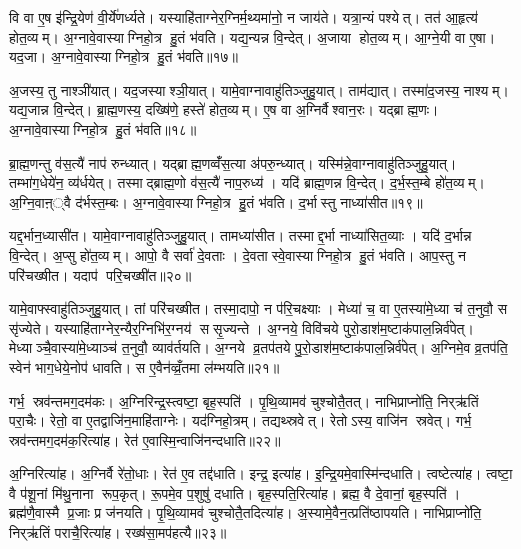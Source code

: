 वि वा ए॒ष इ॑न्द्रि॒येण॑ वी॒र्ये॑णर्ध्यते। यस्याहि॑ताग्नेर॒ग्निर्म॒थ्यमा॑नो॒ न जाय॑ते। यत्रा॒न्यं पश्येत्। तत॑ आ॒हृत्य॑ होत॒व्यम्। अ॒ग्नावे॒वास्याग्निहो॒त्र हु॒तं भ॑वति। यद्य॒न्यन्न वि॒न्देत्। अ॒जाया होत॒व्यम्। आ॒ग्ने॒यी वा ए॒षा। यद॒जा। अ॒ग्नावे॒वास्याग्निहो॒त्र हु॒तं भ॑वति॥१७॥

अ॒जस्य॒ तु नाश्ञी॑यात्। यद॒जस्याश्ञी॒यात्। यामे॒वाग्नावाहु॑तिञ्जुहु॒यात्। ताम॑द्यात्। तस्मा॑द॒जस्य॒ नाश्यम्। यद्य॒जान्न वि॒न्देत्। ब्रा॒ह्म॒णस्य॒ दख्षि॑णे॒ हस्ते॑ होत॒व्यम्। ए॒ष वा अ॒ग्निर्वैश्वान॒रः। यद्ब्राह्म॒णः। अ॒ग्नावे॒वास्याग्निहो॒त्र हु॒तं भ॑वति॥१८॥

ब्रा॒ह्म॒णन्तु व॑स॒त्यै॑ नाप॑ रुन्ध्यात्। यद्ब्राह्म॒णव्वँ॑स॒त्या अ॑परु॒न्ध्यात्। यस्मि॑न्ने॒वाग्नावाहु॑तिञ्जुहु॒यात्। तम्भा॑ग॒धेये॑न॒ व्य॑र्धयेत्। तस्माद्ब्राह्म॒णो व॑स॒त्यै॑ नाप॒रुध्य॑। यदि॑ ब्राह्म॒णन्न वि॒न्देत्। द॒र्भ॒स्त॒म्बे हो॑त॒व्यम्। अ॒ग्नि॒वाऩ््वै द॑र्भस्त॒म्बः। अ॒ग्नावे॒वास्याग्निहो॒त्र हु॒तं भ॑वति। द॒र्भास्तु नाध्या॑सीत॥१९॥

यद्द॒र्भान॒ध्यासी॑त। यामे॒वाग्नावाहु॑तिञ्जुहु॒यात्। तामध्या॑सीत। तस्माद्द॒र्भा नाध्या॑सित॒व्याः। यदि॑ द॒र्भान्न वि॒न्देत्। अ॒प्सु हो॑त॒व्यम्। आपो॒ वै सर्वा॑ दे॒वताः। दे॒वतास्वे॒वास्याग्निहो॒त्र हु॒तं भ॑वति। आप॒स्तु न परि॑चख्षीत। यदाप॑ परि॒चख्षी॑त॥२०॥

यामे॒वाफ्स्वाहु॑तिञ्जुहु॒यात्। तां परि॑चख्षीत। तस्मा॒दापो॒ न प॑रि॒चक्ष्याः। मेध्या॑ च॒ वा ए॒तस्या॑मे॒ध्या च॑ त॒नुवौ॒ स सृ॑ज्येते। यस्याहि॑ताग्नेर॒न्यैर॒ग्निभि॑र॒ग्नय॑ ससृ॒ज्यन्ते। अ॒ग्नये॒ विवि॑चये पुरो॒डाश॑म॒ष्टाक॑पाल॒न्निर्व॑पेत्। मेध्याञ्चै॒वास्या॑मे॒ध्याञ्च॑ त॒नुवौ॒ व्याव॑र्तयति। अ॒ग्नये व्र॒तप॑तये पु॒रो॒डाश॑म॒ष्टाक॑पाल॒न्निर्व॑पेत्। अ॒ग्निमे॒व व्र॒तप॑ति॒ स्वेन॑ भाग॒धेये॒नोप॑ धावति। स ए॒वैन॑व्व्रँ॒तमा ल॑म्भयति॥२१॥

गर्भ॒ स्रव॑न्तमग॒दम॑कः। अ॒ग्निरिन्द्र॒स्त्वष्टा॒ बृह॒स्पति॑। पृ॒थि॒व्यामव॑ चुश्चोतै॒तत्। नाभिप्राप्नो॑ति॒ निर्‌ऋ॑तिं परा॒चैः। रेतो॒ वा ए॒तद्वाजि॑न॒माहि॑ताग्नेः। यद॑ग्निहो॒त्रम्। तद्यथ्स्रवेत्। रेतोऽस्य॒ वाजि॑न स्रवेत्। गर्भ॒ स्रव॑न्तमग॒दम॑क॒रित्या॑ह। रेत॑ ए॒वास्मि॒न्वाजि॑नन्दधाति॥२२॥

अ॒ग्निरित्या॑ह। अ॒ग्निर्वै रे॑तो॒धाः। रेत॑ ए॒व तद्द॑धाति। इन्द्र॒ इत्या॑ह। इ॒न्द्रि॒यमे॒वास्मि॑न्दधाति। त्वष्टेत्या॑ह। त्वष्टा॒ वै प॑शू॒नां मि॑थु॒नाना रूप॒कृत्। रू॒पमे॒व प॒शुषु॑ दधाति। बृह॒स्पति॒रित्या॑ह। ब्रह्म॒ वै दे॒वानां॒ बृह॒स्पति॑। ब्रह्म॑णै॒वास्मै प्र॒जाः प्र ज॑नयति। पृ॒थि॒व्यामव॑ चुश्चोतै॒तदित्या॑ह। अ॒स्यामे॒वैन॒त्प्रति॑ष्ठापयति। नाभिप्राप्नो॑ति॒ निर्‌ऋ॑तिं पराचै॒रित्या॑ह। रख्ष॑सा॒मप॑हत्यै॥२३॥


